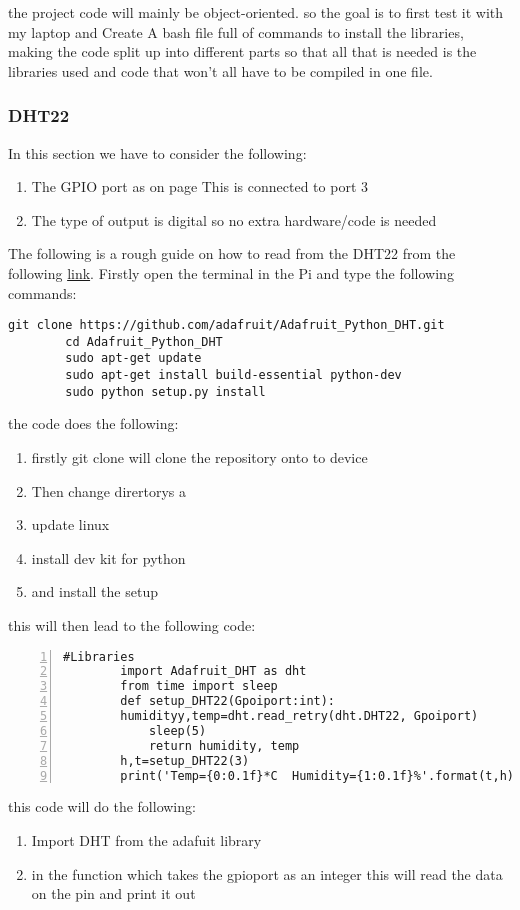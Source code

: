 	the project code will mainly be object-oriented. so the goal is to first test it with my laptop and  Create A bash file full of commands to install the libraries, making the code split up into different parts so that all that is needed is the libraries used and code that won't all have to be compiled in one file.

	\subsubsection{DHT22}
	In this section we have to consider the following: 
	\begin{enumerate}
		\item The GPIO port as on page \pageref{Sychematic for DHT22 revised} This is connected to port 3 
		\item The type of output is digital so no  extra hardware/code is needed
	\end{enumerate}

	The following is a rough guide on how to read from the DHT22 from the following \href{https://www.instructables.com/Raspberry-Pi-Tutorial-How-to-Use-the-DHT-22/}{link}.
	Firstly open the terminal in the Pi and
	type the following commands:
	\begin{lstlisting}[style=bashstyle]
		git clone https://github.com/adafruit/Adafruit_Python_DHT.git
		cd Adafruit_Python_DHT
		sudo apt-get update
		sudo apt-get install build-essential python-dev
		sudo python setup.py install
	\end{lstlisting}
	the code does the following:
	\begin{enumerate}
		\item firstly git clone will clone the  repository onto to device
		\item Then change dirertorys  a
		\item update linux
		\item install dev kit for  python 
		\item and install the setup 
	\end{enumerate}
	
	\newpage
	this will then lead to  the  following code:
	\begin{lstlisting}[style=mystyle,caption={Example code for DHT2},numbers=left,firstnumber=1]
		#Libraries
		import Adafruit_DHT as dht
		from time import sleep
		def setup_DHT22(Gpoiport:int):
		humidityy,temp=dht.read_retry(dht.DHT22, Gpoiport)
			sleep(5)
			return humidity, temp
		h,t=setup_DHT22(3)
		print('Temp={0:0.1f}*C  Humidity={1:0.1f}%'.format(t,h))
	\end{lstlisting}
	this code will do the following:
	\begin{enumerate}
		\item Import DHT from the adafuit library
		\item in the  function which takes the gpioport  as an integer this will read the data on the pin and  print it  out
	\end{enumerate}
	
